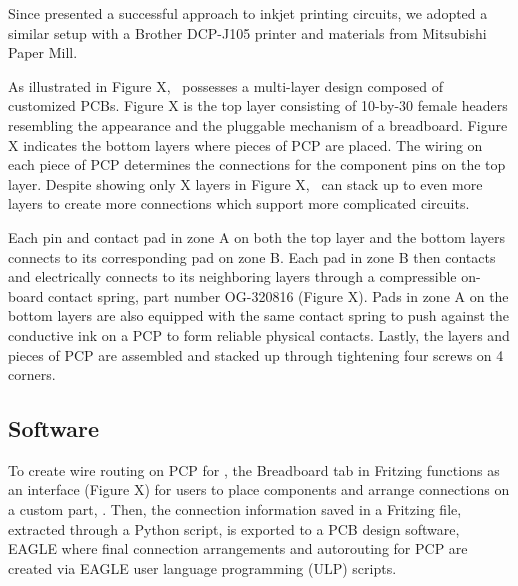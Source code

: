 
Since \cite{Instant_Inkjet_Circuits} presented a successful approach to inkjet printing circuits, we adopted a similar setup with a Brother DCP-J105 printer and materials from Mitsubishi Paper Mill.

As illustrated in Figure X, \papertitle\ possesses a multi-layer design composed of customized PCBs. Figure X is the top layer consisting of 10-by-30 female headers resembling the appearance and the pluggable mechanism of a breadboard. Figure X indicates the bottom layers where pieces of PCP are placed. The wiring on each piece of PCP determines the connections for the component pins on the top layer. Despite showing only X layers in Figure X, \papertitle\ can stack up to even more layers to create more connections which support more complicated circuits.

Each pin and contact pad in zone A on both the top layer and the bottom layers connects to its corresponding pad on zone B. Each pad in zone B then contacts and electrically connects to its neighboring layers through a compressible on-board contact spring, part number OG-320816 (Figure X). Pads in zone A on the bottom layers are also equipped with the same contact spring to push against the conductive ink on a PCP to form reliable physical contacts. Lastly, the layers and pieces of PCP are assembled and stacked up through tightening four screws on 4 corners.

\subsection{Software}

To create wire routing on PCP for \papertitle, the Breadboard tab in Fritzing \cite{Fritzing} functions as an interface (Figure X) for users to place components and arrange connections on a custom part, \papertitle. Then, the connection information saved in a Fritzing file, extracted through a Python script, is exported to a PCB design software, EAGLE \cite{EAGLE} where final connection arrangements and autorouting for PCP are created via EAGLE user language programming (ULP) scripts.




